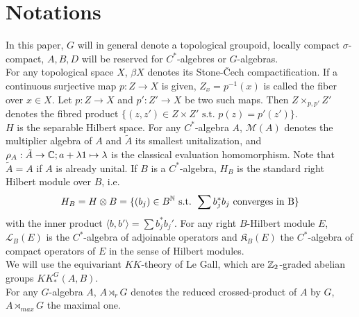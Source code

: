 \section{Notations}

In this paper, $G$ will in general denote a topological groupoid, locally compact $\sigma$-compact, $A,B,D$ will be reserved for $C^*$-algebres or $G$-algebras.\\

For any topological space $X$, $\beta X$ denotes its Stone-\v{C}ech compactification. If a continuous surjective map $p : Z\rightarrow X $ is given, $Z_x = p^{-1}(x)$ is called the fiber over $x\in X$. Let $p : Z\rightarrow X $ and $p' : Z'\rightarrow X $ be two such maps. Then $Z\times_{p,p'} Z'$ denotes the fibred product $\{(z,z')\in Z\times Z' \text{ s.t. } p(z)=p'(z')\}$. \\ 

$H$ is the separable Hilbert space. For any $C^*$-algebra $A$, $\mathcal M(A)$ denotes the multiplier algebra of $A$ and $\tilde A$ its smallest unitalization, and $\rho_A : \tilde A \rightarrow \mathbb C; a+\lambda 1 \mapsto \lambda$ is the classical evaluation homomorphism. Note that $\tilde A=A$ if $A$ is already unital. If $B$ is a $C^*$-algebra, $H_B$ is the standard right Hilbert module over $B$, i.e. \[H_B= H\otimes B=\{(b_j)\in B^\mathbb N \text{ s.t. }\sum b_j^* b_j \text{ converges in B}\}\] with the inner product $\langle b, b'\rangle = \sum b_j^* b_j'$. For any right $B$-Hilbert module $E$, $\mathcal L_B(E)$ is the $C^*$-algebra of adjoinable operators and $\mathfrak K_B(E)$ the $C^*$-algebra of compact operators of $E$ in the sense of Hilbert modules.\\

We will use the equivariant $KK$-theory of Le Gall, which are $\mathbb Z_2$-graded abelian groups $KK^G_*(A,B)$.\\

For any $G$-algebra $A$, $A\rtimes_r G$ denotes the reduced crossed-product of $A$ by $G$, $A\rtimes_{max} G$ the maximal one. 
